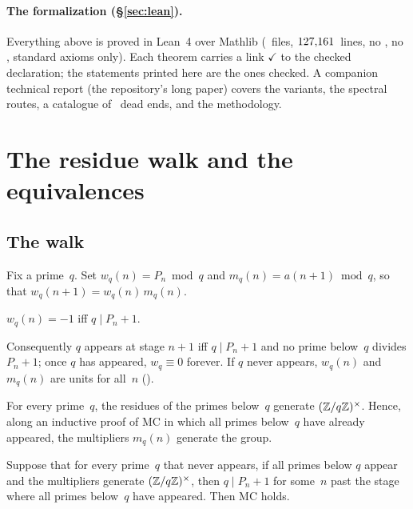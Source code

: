 \documentclass[10pt,a4paper]{article}
\begin{document}
\paragraph{The formalization (\S\ref{sec:lean}).}  Everything above is
proved in Lean~4 over Mathlib (\EMFileCount~files, $127{,}161$~lines,
no , no , standard axioms only).  Each
theorem carries a link {\color{leanink}\sffamily\footnotesize$\checkmark$}
to the checked declaration; the statements printed here are the ones
checked.  A companion technical report (the repository's long paper)
covers the variants, the spectral routes, a catalogue of \DEentries~dead
ends, and the methodology.

\section{The residue walk and the equivalences}
\label{sec:walk}

\subsection{The walk}

Fix a prime~$q$.  Set $w_q(n)=P_n\bmod q$ and $m_q(n)=a(n{+}1)\bmod q$, so
that $w_q(n{+}1)=w_q(n)\,m_q(n)$.

\begin{proposition}
$w_q(n)=-1$ iff $q\mid P_n+1$.
\end{proposition}

Consequently $q$ appears at stage $n{+}1$ iff $q\mid P_n+1$ and no prime
below~$q$ divides $P_n+1$; once $q$ has appeared, $w_q\equiv0$ forever.  If
$q$ never appears, $w_q(n)$ and $m_q(n)$ are units for all~$n$
().

\begin{theorem}
For every prime~$q$, the residues of the primes below~$q$ generate
$(\mathbb{Z}/q\mathbb{Z})^\times$.  Hence, along an inductive proof of MC in which all
primes below~$q$ have already appeared, the multipliers $m_q(n)$ generate
the group.
\end{theorem}

\begin{theorem}
Suppose that for every prime~$q$ that never appears, if all primes below
$q$ appear and the multipliers generate $(\mathbb{Z}/q\mathbb{Z})^\times$, then
$q\mid P_n+1$ for some~$n$ past the stage where all primes below~$q$ have
appeared.  Then MC holds.
\end{theorem}
\end{document}
